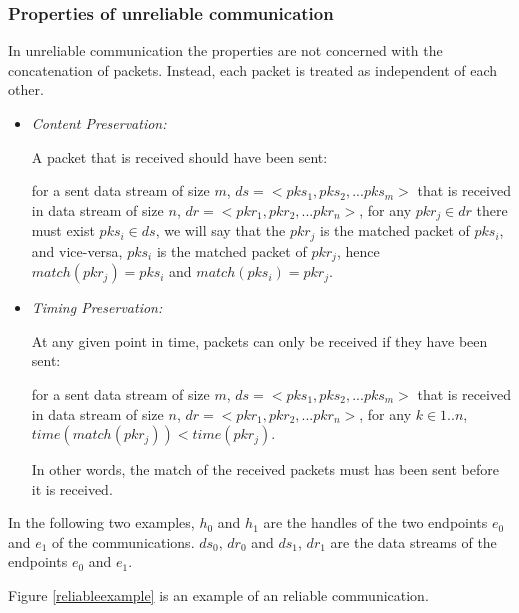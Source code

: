 \subsubsection{Properties of unreliable communication}\label{unreliablepro}
In unreliable communication the properties are not concerned with the concatenation of packets. Instead, each packet is treated as independent of each other.
\begin{itemize}
 \item \textit{ Content Preservation:} 

A packet that is received should have been sent:

for a sent data stream of size $m$, $ds= <pks_1, pks_2, ... pks_m>$ that is received in data stream of size $n$, $dr = <pkr_1, pkr_2, ... pkr_n>$,  for any $pkr_j \in dr$ there must exist $pks_i \in ds$, we will say that the $pkr_j$ is the matched packet of $pks_i$, and vice-versa, $pks_i$ is the matched packet of $pkr_j$, hence $match(pkr_j) = pks_i$  and $match(pks_i) = pkr_j$.

 \item \textit{Timing Preservation:}  
 
At any given point in time, packets can only be received if they have been sent:

for a sent data stream of size $m$, $ds= <pks_1, pks_2, ... pks_m>$ that is received in data stream of size $n$, $dr = <pkr_1, pkr_2, ... pkr_n>$, for any $k \in {1..n}$, $time(match(pkr_j)) < time(pkr_j)$.

In other words, the match of the received packets must has been sent before it is received.
\end{itemize}


In the following two examples, $h_0$ and $h_1$ are the handles of the two endpoints $e_0$ and $e_1$ of the communications. $ds_0$, $dr_0$ and $ds_1$, $dr_1$ are the data streams of the endpoints $e_0$ and $e_1$. 

Figure \ref{reliableexample} is an example of an reliable communication. 

